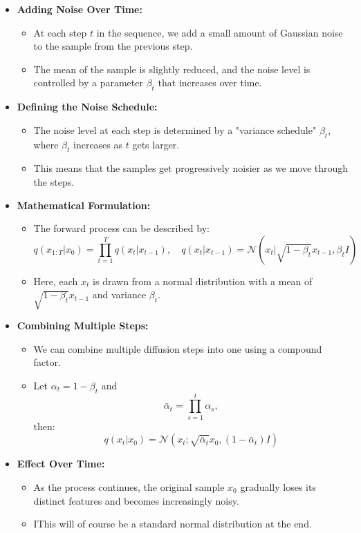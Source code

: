 \documentclass[a4paper]{article}
\begin{document}
\begin{itemize}
    \item \textbf{Adding Noise Over Time:}
    \begin{itemize}
        \item At each step \( t \) in the sequence, we add a small amount of Gaussian noise to the sample from the previous step.
        \item The mean of the sample is slightly reduced, and the noise level is controlled by a parameter \( \beta_t \) that increases over time.
    \end{itemize}

    \item \textbf{Defining the Noise Schedule:}
    \begin{itemize}
        \item The noise level at each step is determined by a "variance schedule" \( \beta_t \), where \( \beta_t \) increases as \( t \) gets larger.
        \item This means that the samples get progressively noisier as we move through the steps.
    \end{itemize}

    \item \textbf{Mathematical Formulation:}
    \begin{itemize}
        \item The forward process can be described by:
        \[
        q(x_{1:T} | x_0) = \prod_{t=1}^{T} q(x_t | x_{t-1}), \quad q(x_t | x_{t-1}) = \mathcal{N}(x_t | \sqrt{1 - \beta_t} x_{t-1}, \beta_t I)
        \]
        \item Here, each \( x_t \) is drawn from a normal distribution with a mean of \( \sqrt{1 - \beta_t} x_{t-1} \) and variance \( \beta_t \).
    \end{itemize}

    \item \textbf{Combining Multiple Steps:}
    \begin{itemize}
        \item We can combine multiple diffusion steps into one using a compound factor.
        \item Let \( \alpha_t = 1 - \beta_t \) and 
        \[
        \bar{\alpha}_t = \prod_{s=1}^{t} \alpha_s,
        \]
        then:
        \[
        q(x_t | x_0) = \mathcal{N}(x_t; \sqrt{\bar{\alpha}_t} x_0, (1 - \bar{\alpha}_t)I)
        \]
    \end{itemize}

    \item \textbf{Effect Over Time:}
    \begin{itemize}
        \item As the process continues, the original sample \( x_0 \) gradually loses its distinct features and becomes increasingly noisy.
        \item IThis will of course be a standard normal distribution at the end.
    \end{itemize}
\end{itemize}
\end{document}
